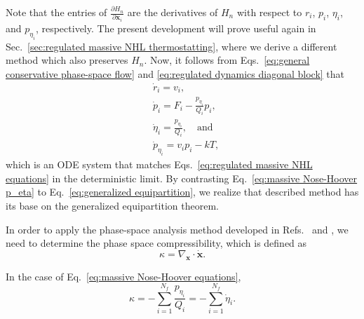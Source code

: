\documentclass[
aip,
jcp,
reprint,
]{revtex4-1}
\newcommand{\vt}[1]{\boldsymbol{\mathbf{#1}}}          %
\newcommand{\diff}[2]{\frac{\partial #2}{\partial #1}} %
\newcommand{\grad}[2]{\diff{#1}{#2}}                   %
\newcommand{\nn}{n}
\begin{document}
Note that the entries of $\grad{\vt x_i}{H_\nn}$ are the derivatives of ${H_\nn}$ with respect to $r_i$, $p_i$, $\eta_i$, and $p_{\eta_i}$, respectively.
The present development will prove useful again in Sec.~\ref{sec:regulated massive NHL thermostatting}, where we derive a different method which also preserves $H_\nn$.
Now, it follows from Eqs.~\eqref{eq:general conservative phase-space flow} and \eqref{eq:regulated dynamics diagonal block} that
\begin{subequations}
	\label{eq:massive Nose-Hoover equations}
	\begin{align}
	&\dot{r}_i = v_i, \\
	&\dot{p}_i = F_i - \frac{p_{\eta_i}}{Q_i} p_i, \\
	&\dot{\eta}_i = \frac{p_{\eta_i}}{Q_i}, \quad \mathrm{and} \\
	&\dot{p}_{\eta_i} = v_i p_i - kT, \label{eq:massive Nose-Hoover p_eta}
	\end{align}
\end{subequations}
which is an ODE system that matches Eqs.~\eqref{eq:regulated massive NHL equations} in the deterministic limit.
By contrasting Eq.~\eqref{eq:massive Nose-Hoover p_eta} to Eq.~\eqref{eq:generalized equipartition}, we realize that described method has its base on the generalized equipartition theorem.

In order to apply the phase-space analysis method developed in Refs.~ and , we need to determine the phase space compressibility, which is defined as
\begin{equation}
\label{eq:phase space compressibility}
\kappa = \nabla_{\vt x} \cdot \dot{\vt x}.
\end{equation}

In the case of Eq.~\eqref{eq:massive Nose-Hoover equations},
\begin{equation}
\label{eq:Nose-Hoover compressibility}
\kappa = -\sum_{i=1}^{N_f} \frac{p_{\eta_i}}{Q_i} = -\sum_{i=1}^{N_f} \dot{\eta}_i.
\end{equation}
\end{document}
